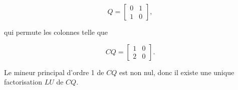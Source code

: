 \begin{equation*}
  Q = \begin{bmatrix}
        0 & 1   \\
        1 & 0
      \end{bmatrix}
      ,
\end{equation*}

qui permute les colonnes telle que

\begin{equation*}
  CQ = \begin{bmatrix}
        1 & 0  \\
        2 & 0
      \end{bmatrix}
      .
\end{equation*}

Le mineur principal d'ordre 1 de $CQ$ est non nul, donc il existe une unique factorisation $LU$ de $CQ$.
